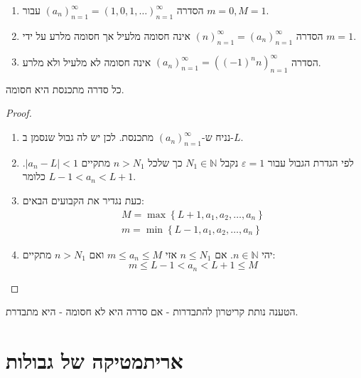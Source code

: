 \documentclass{tstextbook}
\begin{document}
\begin{example}
  \begin{enumerate}
    \item הסדרה \((a_n)_{n=1}^\infty=\left( 1,0,1,\dots \right)_{n=1}^\infty\) עבור \(m=0,M=1\). 


    \item הסדרה \((n)_{n=1}^\infty=(a_n)_{n=1}^\infty\) אינה חסומה מלעיל אך חסומה מלרע על ידי \(m=1\). 


    \item הסדרה \((a_n)_{n=1}^\infty=((-1)^{n}n)_{n=1}^\infty\) אינה חסומה לא מלעיל ולא מלרע. 


  \end{enumerate}
\end{example}
\begin{proposition}
כל סדרה מתכנסת היא חסומה.

\end{proposition}
\begin{proof}
  \begin{enumerate}
    \item נניח ש-\((a_n)_{n=1}^\infty\) מתכנסת. לכן יש לה גבול שנסמן ב-\(L\). 


    \item לפי הגדרת הגבול עבור \(\varepsilon=1\) נקבל \(N_{1}\in \mathbb{N}\) כך שלכל \(n>N_{1}\) מתקיים \(|a_{n}-L|<1\). כלומר \(L-1<a_{n}<L+1\). 


    \item כעת נגדיר את הקבועים הבאים: 
\begin{gather*}M=\max \left\{  L+1,a_{1}, a_{2},\dots,a_{n}  \right\} \\m=\min \left\{  L-1 ,a_{1},a_{2},\dots,a_{n} \right\}
\end{gather*}


    \item יהי \(n \in \mathbb{N}\). אם \(n\leq N_{1}\) אזי \(m\leq a_{n}\leq M\) ואם \(n>N_{1}\) מתקיים: 
$$m\leq L-1<a_{n}<L+1\leq M$$


  \end{enumerate}
\end{proof}
\begin{remark}
הטענה נותת קריטרון להתבדרות - אם סדרה היא לא חסומה - היא מתבדרת.

\end{remark}
\section{אריתמטיקה של גבולות}
\end{document}
